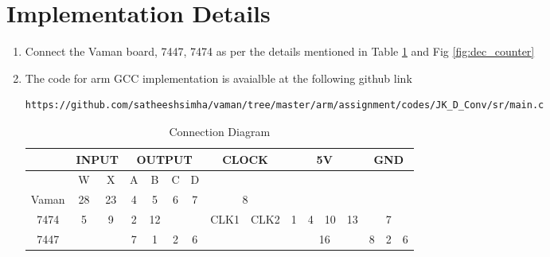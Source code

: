 \documentclass[journal,12pt,twocolumn]{IEEEtran}
\begin{document}
\section{\textbf{Implementation Details}}
\begin{enumerate}[1.]

\item Connect the Vaman board, 7447, 7474 as per the details mentioned in Table \ref{table:Connection_table} and Fig \ref{fig:dec_counter}

\item The code for arm GCC implementation is avaialble at the following github link

\begin{lstlisting}
https://github.com/satheeshsimha/vaman/tree/master/arm/assignment/codes/JK_D_Conv/sr/main.c
\end{lstlisting}

\vspace{9cm}

\begin{table}[h!]
	\begin{center}
		\begin{tabular}{ |c|c|c|c|c|c|c|c|c|c|c|c|c|c|c|c| } 
			\hline
			\multicolumn{1}{|c|}{} &\multicolumn{2}{|c|}{\textbf{INPUT}} & \multicolumn{4}{|c|}{\textbf{OUTPUT}} &\multicolumn{2}{|c|}{\textbf{CLOCK}} &\multicolumn{4}{|c|}{\textbf{5V}} &\multicolumn{3}{|c|}{\textbf{GND}}\\
			\hline
			\multicolumn{1}{|c|}{} & \multicolumn{1}{|c|}{W} & \multicolumn{1}{|c|}{X} & \multicolumn{1}{|c|}{A} & \multicolumn{1}{|c|}{B} & \multicolumn{1}{|c|}{C} & \multicolumn{1}{|c|}{D}& \multicolumn{2}{|c|}{} & \multicolumn{4}{|c|}{} & \multicolumn{3}{|c|}{}   \\
			\hline
			\multicolumn{1}{|c|}{Vaman} & \multicolumn{1}{|c|}{28} & \multicolumn{1}{|c|}{23} & \multicolumn{1}{|c|}{4} & \multicolumn{1}{|c|}{5} & \multicolumn{1}{|c|}{6} & \multicolumn{1}{|c|}{7} & \multicolumn{2}{|c|}{8} & \multicolumn{4}{|c|}{} & \multicolumn{3}{|c|}{}\\
			\hline
			\multicolumn{1}{|c|}{7474} & \multicolumn{1}{|c|}{5} & \multicolumn{1}{|c|}{9} & \multicolumn{1}{|c|}{2} & \multicolumn{1}{|c|}{12} & \multicolumn{2}{|c|}{} & \multicolumn{1}{|c|}{CLK1} & \multicolumn{1}{|c|}{CLK2} & \multicolumn{1}{|c|}{1} & \multicolumn{1}{|c|}{4} & \multicolumn{1}{|c|}{10} & \multicolumn{1}{|c|}{13} & \multicolumn{3}{|c|}{7} \\
			\hline
			\multicolumn{1}{|c|}{7447} & \multicolumn{2}{|c|}{} & \multicolumn{1}{|c|}{7} & \multicolumn{1}{|c|}{1} & \multicolumn{1}{|c}{2} & \multicolumn{1}{|c|}{6} & \multicolumn{2}{|c|}{} & \multicolumn{4}{|c|}{16} & \multicolumn{1}{|c|}{8} & \multicolumn{1}{|c|}{2} & \multicolumn{1}{|c|}{6}\\
			\hline
		\end{tabular}
		\caption{Connection Diagram}
		\label{table:Connection_table}
	\end{center}
\end{table}


\end{enumerate}
\end{document}
